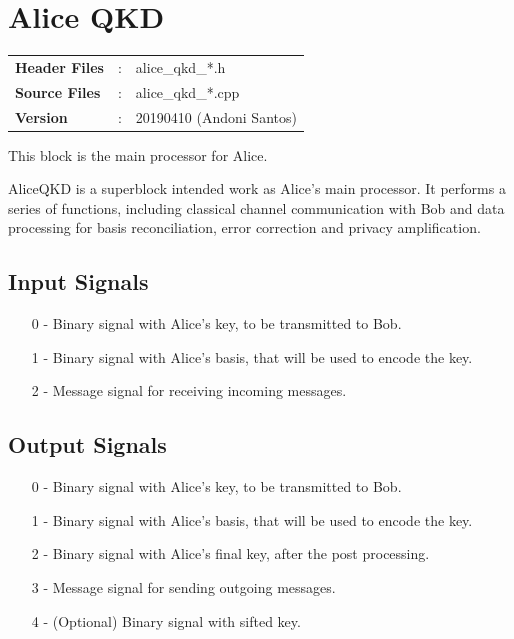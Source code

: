 \clearpage
\graphicspath{{./lib/alice_qkd2/figures/}}
\section{Alice QKD}

\begin{tcolorbox}	
	\begin{tabular}{p{2.75cm} p{0.2cm} p{10.5cm}} 	
        \textbf{Header Files}    &:& alice\_qkd\_*.h \\
		\textbf{Source Files}    &:& alice\_qkd\_*.cpp \\
        \textbf{Version}         &:& 20190410 (Andoni Santos)
	\end{tabular}
\end{tcolorbox}

\maketitle
This block is the main processor for Alice. 

AliceQKD is a superblock intended work as Alice's main processor. It performs a 
series of functions, including classical channel communication with Bob and 
data processing for basis reconciliation, error correction and privacy 
amplification.

\subsection*{Input Signals}

\begin{itemize}
	\item[0] - Binary signal with Alice's key, to be transmitted to Bob.
	\item[1] - Binary signal with Alice's basis, that will be used to encode the key.
	\item[2] - Message signal for receiving incoming messages.
\end{itemize}

\subsection*{Output Signals}

\begin{itemize}
	\item[0] - Binary signal with Alice's key, to be transmitted to Bob.
	\item[1] - Binary signal with Alice's basis, that will be used to encode the key.
	\item[2] - Binary signal with Alice's final key, after the post processing.
	\item[3] - Message signal for sending outgoing messages.
	\item[4] - (Optional) Binary signal with sifted key.
\end{itemize}

